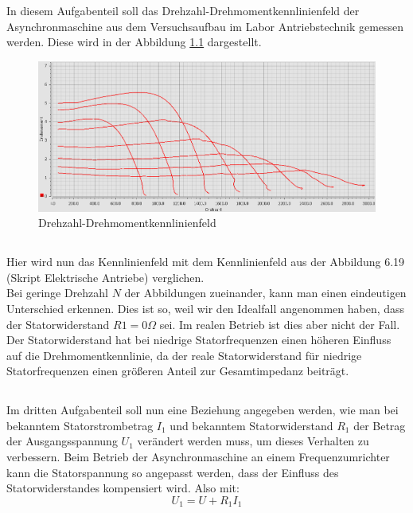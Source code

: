 \chapter{}
\section{}
In diesem Aufgabenteil soll das Drehzahl-Drehmomentkennlinienfeld der Asynchronmaschine aus dem Versuchsaufbau im Labor Antriebstechnik gemessen werden. Diese wird in der Abbildung \ref{fig:7a} dargestellt.
\begin{figure}[h]
	\centering
	\includegraphics[width=\textwidth]{./Bilder/ele3.png}
	\caption{Drehzahl-Drehmomentkennlinienfeld}
	\label{fig:7a}
\end{figure}

\section{}
Hier wird nun das Kennlinienfeld mit dem Kennlinienfeld aus der Abbildung 6.19 (Skript Elektrische Antriebe) verglichen.\\
Bei geringe Drehzahl $ N $ der Abbildungen zueinander, kann man einen eindeutigen Unterschied erkennen. Dies ist so, weil wir den Idealfall angenommen haben, dass der Statorwiderstand $ R1 = 0\Omega $ sei. Im realen Betrieb ist dies aber nicht der Fall. Der Statorwiderstand hat bei niedrige Statorfrequenzen einen höheren Einfluss auf die Drehmomentkennlinie, da der reale Statorwiderstand für niedrige Statorfrequenzen einen größeren Anteil zur Gesamtimpedanz beiträgt.

\section{}
Im dritten Aufgabenteil soll nun eine Beziehung angegeben werden, wie man bei bekanntem Statorstrombetrag $ I_{1} $ und bekanntem Statorwiderstand $ R_{1} $ der Betrag der Ausgangsspannung $ U_{1} $ verändert werden muss, um dieses Verhalten zu verbessern. Beim Betrieb der Asynchronmaschine an einem Frequenzumrichter kann die Statorspannung so angepasst werden, dass der Einfluss des Statorwiderstandes kompensiert wird. Also mit:
\begin{equation}
	U_{1} = U + R_{1}I_{1}
\end{equation}

